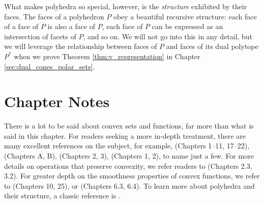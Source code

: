 What makes polyhedra so special, however, is the \emph{structure} exhibited by
their faces. The faces of a polyhedron $P$ obey a beautiful recursive 
structure: each face of a face of $P$ is also a face of $P$, each face of $P$
can be expressed as an intersection of facets of $P$, and so on. 
We will not go into this in any detail, but we will leverage the relationship
between faces of $P$ and faces of its dual polytope $P^*$ when we prove
Theorem \ref{thm:v_representation} in Chapter \ref{sec:dual_cones_polar_sets}. 

\SkipTocEntry\section*{Chapter Notes}

There is a lot to be said about convex sets and functions, far more than what is
said in this chapter. For readers seeking a more in-depth treatment, there are
many excellent references on the subject, for example,
\cite{rockafellar1970convex} (Chapters 1--11, 17--22),
\cite{hiriartUrruty2001fundamentals} (Chapters A, B), \cite{boyd2004convex}
(Chapters 2, 3), \cite{bertsekas2009convex} (Chapters 1, 2), to name just a
few. For more details on operations that preserve convexity, we refer readers to 
\cite{boyd2004convex} (Chapters 2.3, 3.2). For greater depth on the smoothness
properties of convex functions, we refer to \cite{rockafellar1970convex}
(Chapters 10, 25), or \cite{evans2015measure} (Chapters 6.3, 6.4). To learn more
about polyhedra and their structure, a classic reference is
\cite{grunbaum2003convex}.  

